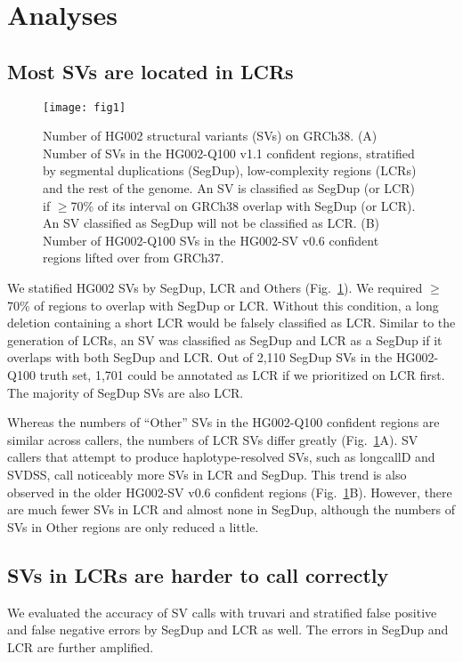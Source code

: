 \documentclass[a4paper,num-refs]{oup-contemporary}
\begin{document}
\section{Analyses}

\subsection{Most SVs are located in LCRs}

\begin{figure}[tb]
\texttt{[image: fig1]}
\caption{Number of HG002 structural variants (SVs) on GRCh38.
(A) Number of SVs in the HG002-Q100 v1.1 confident regions,
stratified by segmental duplications (SegDup),
low-complexity regions (LCRs) and the rest of the genome.
An SV is classified as SegDup (or LCR) if $\ge$70\% of its interval on GRCh38 overlap with SegDup (or LCR).
An SV classified as SegDup will not be classified as LCR.
(B) Number of HG002-Q100 SVs in the HG002-SV v0.6 confident regions lifted over from GRCh37.}\label{fig:count}
\end{figure}

We statified HG002 SVs by SegDup, LCR and Others (Fig.~\ref{fig:count}).
We required $\ge$70\% of regions to overlap with SegDup or LCR.
Without this condition, a long deletion containing a short LCR would be falsely classified as LCR.
Similar to the generation of LCRs, an SV was classified as SegDup and LCR as a SegDup if it overlaps with both SegDup and LCR.
Out of 2,110 SegDup SVs in the HG002-Q100 truth set, 1,701 could be annotated as LCR if we prioritized on LCR first.
The majority of SegDup SVs are also LCR.

Whereas the numbers of ``Other'' SVs in the HG002-Q100 confident regions are similar across callers,
the numbers of LCR SVs differ greatly (Fig.~\ref{fig:count}A).
SV callers that attempt to produce haplotype-resolved SVs, such as longcallD and SVDSS, call noticeably more SVs in LCR and SegDup.
This trend is also observed in the older HG002-SV v0.6 confident regions (Fig.~\ref{fig:count}B).
However, there are much fewer SVs in LCR and almost none in SegDup, although the numbers of SVs
in Other regions are only reduced a little.

\subsection{SVs in LCRs are harder to call correctly}

We evaluated the accuracy of SV calls with truvari
and stratified false positive and false negative errors by SegDup and LCR as well.
The errors in SegDup and LCR are further amplified.
\end{document}
